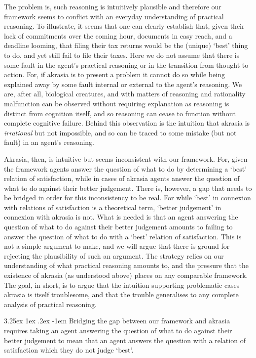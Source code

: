 \documentclass[10pt]{article}
\makeatletter
\renewcommand\paragraph{\@startsection{paragraph}{5}{\z@}%
  {3.25ex \@plus1ex \@minus.2ex}%
  {-1em}%
  {\normalfont\normalsize\bfseries}}
\makeatother
\begin{document}
The problem is, such reasoning is intuitively plausible and therefore our framework seems to conflict with an everyday understanding of practical reasoning.
To illustrate, it seems that one can clearly establish that, given their lack of commitments over the coming hour, documents in easy reach, and a deadline looming, that filing their tax returns would be the (unique) ‘best’ thing to do, and yet still fail to file their taxes.
Here we do not assume that there is some fault in the agent's practical reasoning or in the transition from thought to action.
For, if akrasia is to present a problem it cannot do so while being explained away by some fault internal or external to the agent's reasoning.
We are, after all, biological creatures, and with matters of reasoning and rationality malfunction can be observed without requiring explanation as reasoning is distinct from cognition itself, and so reasoning can cease to function without complete cognitive failure.
Behind this observation is the intuition that akrasia is \emph{irrational} but not impossible, and so can be traced to some mistake (but not fault) in an agent's reasoning.

Akrasia, then, is intuitive but seems inconsistent with our framework.
For, given the framework agents answer the question of what to do by determining a `best' relation of satisfaction, while in cases of akrasia agents answer the question of what to do against their better judgement.
There is, however, a gap that needs to be bridged in order for this inconsistency to be real.
For while `best' in connexion with relations of satisfaction is a theoretical term, `better judgement' in connexion with akrasia is not.
What is needed is that an agent answering the question of what to do against their better judgement amounts to failing to answer the question of what to do with a `best' relation of satisfaction.
This is not a simple argument to make, and we will argue that there is ground for rejecting the plausibility of such an argument.
The strategy relies on our understanding of what practical reasoning amounts to, and the pressure that the existence of akrasia (as understood above) places on any comparable framework.
The goal, in short, is to argue that the intuition supporting problematic cases akrasia is itself troublesome, and that the trouble generalises to any complete analysis of practical reasoning.

\paragraph{ }
Bridging the gap between our framework and akrasia requires taking an agent answering the question of what to do against their better judgement to mean that an agent answers the question with a relation of satisfaction which they do not judge `best'.
\end{document}
